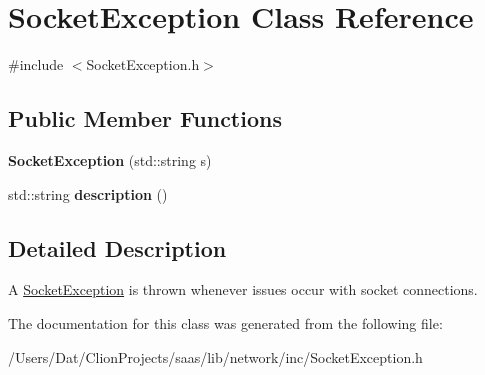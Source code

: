 \hypertarget{class_socket_exception}{}\section{Socket\+Exception Class Reference}
\label{class_socket_exception}


{\ttfamily \#include $<$Socket\+Exception.\+h$>$}

\subsection*{Public Member Functions}
\begin{DoxyCompactItemize}
\item 
{\bfseries Socket\+Exception} (std\+::string s)\hypertarget{class_socket_exception_a09ddb0c061c40fcb527ff89a2e803342}{}\label{class_socket_exception_a09ddb0c061c40fcb527ff89a2e803342}

\item 
std\+::string {\bfseries description} ()\hypertarget{class_socket_exception_ad7920caebddc99b6bbb7dbede569fa18}{}\label{class_socket_exception_ad7920caebddc99b6bbb7dbede569fa18}

\end{DoxyCompactItemize}


\subsection{Detailed Description}
A \hyperlink{class_socket_exception}{Socket\+Exception} is thrown whenever issues occur with socket connections. 

The documentation for this class was generated from the following file\+:\begin{DoxyCompactItemize}
\item 
/\+Users/\+Dat/\+Clion\+Projects/saas/lib/network/inc/Socket\+Exception.\+h\end{DoxyCompactItemize}
